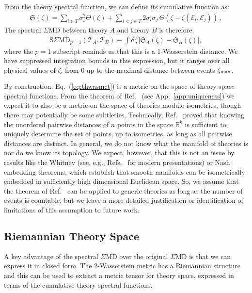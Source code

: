 \documentclass[letterpaper,11pt]{article}
\DeclareRobustCommand{\App}[1]{App.~\ref{#1}}
\DeclareRobustCommand{\Eq}[1]{Eq.~(\ref{#1})}
\DeclareRobustCommand{\InRef}[1]{Ref.~\cite{#1}}
\DeclareRobustCommand{\Refs}[1]{Refs.~\cite{#1}}
\begin{document}
From the theory spectral function, we can define its cumulative function as:
%
\begin{align}
{\mathfrak S}(\zeta) = \sum_{i\in T }\sigma_i^2\Theta(\zeta)+\sum_{i<j\in T} 2\sigma_i\sigma_j\, \Theta\left(
\zeta-\zeta(\mathcal{E}_i, \mathcal{E}_j)
\right)\,,
\end{align}
The spectral $\Sigma$MD between theory $A$ and theory $B$ is therefore:
%
\begin{align}\label{eq:thwasmet}
\text{S$\Sigma$MD}_{p=1}(\mathcal{T}_A, \mathcal{T}_B) \equiv \int d\zeta \, \left|{\mathfrak S}_A(\zeta)-{\mathfrak S}_B(\zeta)\right| ,
\end{align}
%
where the $p = 1$ subscript reminds us that this is a 1-Wasserstein distance.
%
We have suppressed integration bounds in this expression, but it ranges over all physical values of $\zeta$, from 0 up to the maximal distance between events $\zeta_{\rm max}$.

By construction, \Eq{eq:thwasmet} is a metric on the space of theory space spectral functions.
%
From the theorem of \InRef{BOUTIN2004709} (see \App{app:uniqueness}) we expect it to also be a metric on the space of theories modulo isometries, though there may potentially be some subtleties.
%
Technically, \InRef{BOUTIN2004709} proved that knowing the unordered pairwise distances of $n$ points in the space ${\mathbb R}^k$ is sufficient to uniquely determine the set of points, up to isometries, as long as all pairwise distances are distinct.
%
In general, we do not know what the manifold of theories is nor do we know its topology.
%
We expect, however, that this is not an issue by results like the Whitney \cite{whitney1936differentiable} (see, e.g., \Refs{prasolov2007elements,adachi2012embeddings} for modern presentations) or Nash \cite{nash1954c1,kuiper1955c1,kuiper1955c2} embedding theorems, which establish that smooth manifolds can be isometrically embedded in sufficiently high dimensional Euclidean space.
%
So, we assume that the theorem of \InRef{BOUTIN2004709} can be applied to generic theories as long as the number of events is countable, but we leave a more detailed justification or identification of limitations of this assumption to future work.


\subsection{Riemannian Theory Space}

A key advantage of the spectral $\Sigma$MD over the original $\Sigma$MD is that we can express it in closed form.
%
The 2-Wasserstein metric has a Riemannian structure \cite{lott2006ricci,lott2007geometric,villani2008optimal} and this can be used to extract a metric tensor for theory space, expressed in terms of the cumulative theory spectral functions.
\end{document}

